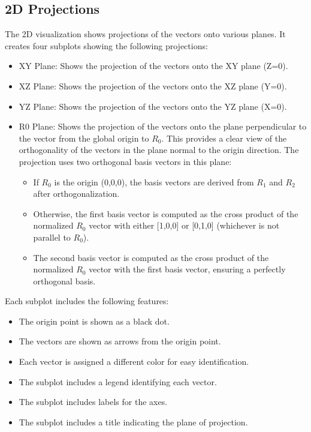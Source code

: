 \subsection{2D Projections}

The 2D visualization shows projections of the vectors onto various planes. It creates four subplots showing the following projections:

\begin{itemize}
    \item XY Plane: Shows the projection of the vectors onto the XY plane (Z=0).
    \item XZ Plane: Shows the projection of the vectors onto the XZ plane (Y=0).
    \item YZ Plane: Shows the projection of the vectors onto the YZ plane (X=0).
    \item R0 Plane: Shows the projection of the vectors onto the plane perpendicular to the vector from the global origin to $R_0$. This provides a clear view of the orthogonality of the vectors in the plane normal to the origin direction. The projection uses two orthogonal basis vectors in this plane:
        \begin{itemize}
            \item If $R_0$ is the origin (0,0,0), the basis vectors are derived from $R_1$ and $R_2$ after orthogonalization.
            \item Otherwise, the first basis vector is computed as the cross product of the normalized $R_0$ vector with either [1,0,0] or [0,1,0] (whichever is not parallel to $R_0$).
            \item The second basis vector is computed as the cross product of the normalized $R_0$ vector with the first basis vector, ensuring a perfectly orthogonal basis.
        \end{itemize}
\end{itemize}

Each subplot includes the following features:

\begin{itemize}
    \item The origin point is shown as a black dot.
    \item The vectors are shown as arrows from the origin point.
    \item Each vector is assigned a different color for easy identification.
    \item The subplot includes a legend identifying each vector.
    \item The subplot includes labels for the axes.
    \item The subplot includes a title indicating the plane of projection.
\end{itemize}

